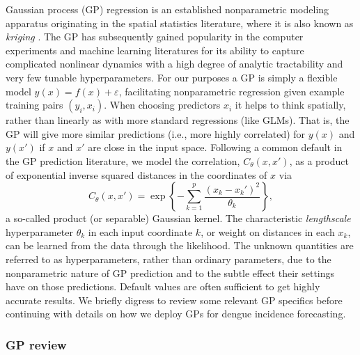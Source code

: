 \documentclass[12pt]{article}
\begin{document}
Gaussian process (GP) regression is an established nonparametric modeling
apparatus originating in the spatial statistics literature, where it is also
known as {\em kriging} \citep{math:1963,cressie:1993}. The GP has subsequently
gained popularity in the computer experiments \citep{sacks1989design} and
machine learning literatures \citep{rasmu:will:2006} for its ability to
capture complicated nonlinear dynamics with a high degree of analytic
tractability and very few tunable hyperparameters. For our purposes a GP is
simply a flexible model $y(x) = f(x) + \varepsilon$, facilitating
nonparametric regression given example training pairs $(y_i, x_i)$.  When
choosing predictors $x_i$ it helps to think spatially, rather than linearly as
with more standard regressions (like GLMs).  That is, the GP will give more
similar predictions (i.e., more highly correlated) for $y(x)$ and $y(x')$ if
$x$ and $x'$ are close in the input space.  Following a common default in the
GP prediction literature, we model the correlation, $C_\theta(x, x')$, as a
product of exponential inverse squared distances in the coordinates of $x$ via
\begin{equation}
C_\theta(x, x') = \exp\left\{- \sum_{k=1}^p \frac{(x_k - x_k')^2}{\theta_k} \right\}, \label{eq:cgauss}
\end{equation}
a so-called product (or separable) Gaussian kernel. The characteristic {\em
lengthscale} hyperparameter $\theta_k$ in each input coordinate $k$, or
weight on distances in each $x_k$, can be learned from the data through the
likelihood.  The unknown quantities are referred to as hyperparameters, rather
than ordinary parameters, due to the nonparametric nature of GP prediction and
to the subtle effect their settings have on those predictions.
Default values are often sufficient to get highly accurate results.  We
briefly digress to review some relevant GP specifics before continuing with
details on how we deploy GPs for dengue incidence forecasting.

\subsubsection{GP review}
\end{document}
